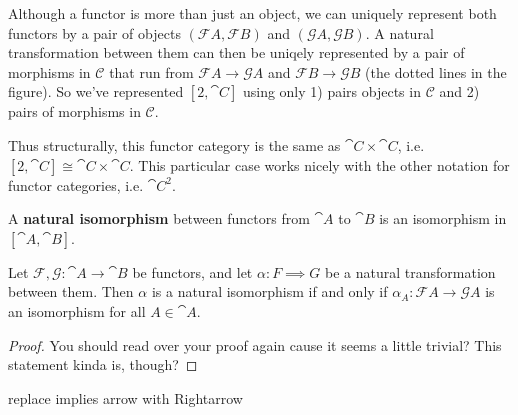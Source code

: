 \documentclass[twoside,10pt]{report}
\begin{document}
Although a functor is more than just an object, we can uniquely represent both functors by a pair of objects $(\mathcal{F}A, \mathcal{F}B)$ and $(\mathcal{G}A, \mathcal{G}B)$. A natural transformation between them can then be uniqely represented by a pair of morphisms in $\mathcal{C}$ that run from $\mathcal{F}A\to \mathcal{G}A$ and $\mathcal{F}B\to \mathcal{G}B$ (the dotted lines in the figure). So we've represented $[2, \cat{C}]$ using only 1) pairs objects in $\mathcal{C}$ and 2) pairs of morphisms in $\mathcal{C}$.

Thus structurally, this functor category is the same as $\cat{C} \times \cat{C}$, i.e. $[2, \cat{C}] \cong \cat{C} \times \cat{C}$. This particular case works nicely with the other notation for functor categories, i.e. $\cat{C}^2$.

\begin{defn}
	A \textbf{natural isomorphism} between functors from $\cat{A}$ to $\cat{B}$ is an isomorphism in $[\cat{A},\cat{B}].$
\end{defn}

\begin{prop}
Let $\mathcal{F},\mathcal{G}:\cat{A}\to \cat{B}$ be functors, and let $\alpha:F\implies G$ be a natural transformation between them. Then $\alpha$ is a natural isomorphism if and only if $\alpha_A:\mathcal{F}A\to \mathcal{G}A$ is an isomorphism for all $A \in \cat{A}$.
\end{prop}
\begin{proof}
{\color{red}You should read over your proof again cause it seems a little trivial? This statement kinda is, though?}
\end{proof}

{\color{red}replace implies arrow with Rightarrow}
\end{document}
